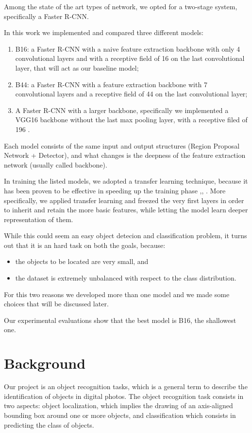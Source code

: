 \documentclass[a4paper,10pt]{report}
\begin{document}
Among the state of the art types of network, we opted for a two-stage system, specifically a Faster R-CNN.

In this work we implemented and compared three different models:
\begin{enumerate}
  \item B16: a Faster R-CNN with a naive feature extraction backbone with only 4 convolutional layers and with a receptive field of 16 on the last convolutional layer, that will act as our baseline model;
  \item B44: a Faster R-CNN with a feature extraction backbone with 7 convolutional layers and a receptive field of 44 on the last convolutional layer;
  \item A Faster R-CNN with a larger backbone, specifically we implemented a VGG16 backbone without the last max pooling layer, with a receptive filed of 196 \cite{vgg}.
\end{enumerate}
Each model consists of the same input and output structures (Region Proposal Network + Detector), and what changes is the deepness of the feature extraction network (usually called backbone).

In training the listed models, we adopted a transfer learning technique, because it has been proven to be effective in speeding up the training phase \cite{claran},\cite{transfer-learning-1}, \cite{transfer-learning-2}.
More specifically, we applied transfer learning and freezed the very first layers in order to inherit and retain the more basic features, while letting the model learn deeper representation of them.

While this could seem an easy object detecion and classification problem, it turns out that it is an hard task on both the goals, because:
\begin{itemize}
  \item the objects to be located are very small, and
  \item the dataset is extremely unbalanced with respect to the class distribution.
\end{itemize}

For this two reasons we developed more than one model and we made some choices that will be discussed later.

Our experimental evaluations show that the best model is B16, the shallowest one.

\chapter{Background}\label{chap:background}
Our project is an object recognition tasks, which is a general term to describe the identification of objects
in digital photos. 
The object recognition task consists in two aspects: object localization, which implies the drawing of an 
axis-aligned  bounding box around one or more objects, and classification which consists in predicting the class 
of objects.
\end{document}
